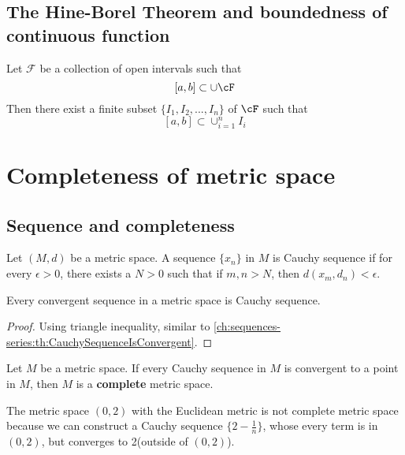 \begin{refsection}
\subsection{The Hine-Borel Theorem and boundedness of continuous function}
\begin{theorem}\cite[113]{johnsonbaugh2010foundations}
Let $\mathcal{F}$ be a collection of open intervals such that $$[a,b] \subset \cup \cF $$
Then there exist a finite subset $\{I_1,I_2,...,I_n\}$ of $\cF$ such that 
$$[a,b] \subset \cup_{i=1}^n I_i$$
\end{theorem}



\section{Completeness of metric space}
\subsection{Sequence and completeness}
\begin{definition}
\cite[159]{johnsonbaugh2010foundations} Let $(M,d)$ be a metric space. A sequence $\{x_n\}$ in $M$ is Cauchy sequence if for every $\epsilon >0$, there exists a $N>0$ such that 
if $m,n > N$, then $d(x_m,d_n) < \epsilon$.
\end{definition}

\begin{theorem}
	Every convergent sequence in a metric space is Cauchy sequence.
\end{theorem}
\begin{proof}
Using triangle inequality, similar to  \autoref{ch:sequences-series:th:CauchySequenceIsConvergent}.
\end{proof}





\begin{definition}\label{ch:metric-space:def:completeMetricSpace}
\cite[159]{johnsonbaugh2010foundations}Let $M$ be a metric space. If every Cauchy sequence in $M$ is convergent to a point in $M$, then $M$ is a \textbf{complete} metric space.
\end{definition}

\begin{example}
The metric space $(0,2)$ with the Euclidean metric is not complete metric space because we can construct a Cauchy sequence $\{2-\frac{1}{n}\}$, whose every term is in $(0,2)$, but converges to 2(outside of $(0,2)$).  	
\end{example}





\end{refsection}
